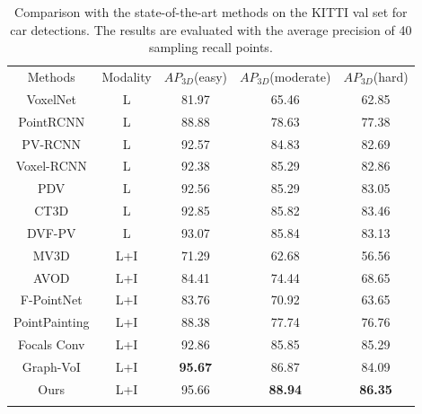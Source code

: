 \begin{sloppypar}
\begin{table}[!t]
\renewcommand{\arraystretch}{1.3}
\setlength\tabcolsep{28pt}%
\caption{Comparison with the state-of-the-art methods on the KITTI val set for car detections. The results are evaluated with the average precision of 40 sampling recall points.}
\label{table1}
\centering
\begin{tabular*}{\linewidth}{ccccc}
\hline\noalign{\smallskip}
Methods & Modality & $AP_{3D}$(easy) & $AP_{3D}$(moderate) & $AP_{3D}$(hard) \\
\noalign{\smallskip}\hline\noalign{\smallskip}
VoxelNet\cite{19} & L & 81.97 & 65.46 & 62.85 \\
PointRCNN\cite{5} & L & 88.88 & 78.63 & 77.38 \\
PV-RCNN\cite{4} & L & 92.57 & 84.83 & 82.69 \\
Voxel-RCNN\cite{21} & L & 92.38  & 85.29 & 82.86 \\
PDV\cite{3} & L & 92.56 & 85.29 & 83.05 \\
CT3D\cite{2} & L & 92.85 & 85.82 & 83.46 \\ 
DVF-PV\cite{32} & L & 93.07 & 85.84 & 83.13 \\
MV3D\cite{12} & L+I & 71.29 & 62.68 & 56.56 \\
AVOD\cite{13} & L+I & 84.41 & 74.44 & 68.65 \\
F-PointNet\cite{10} & L+I & 83.76 & 70.92 & 63.65  \\
PointPainting\cite{11} & L+I & 88.38 & 77.74 & 76.76 \\
Focals Conv\cite{7} & L+I & 92.86 & 85.85 & 85.29 \\
Graph-VoI\cite{31} & L+I & \bf{95.67} & 86.87 & 84.09 \\
Ours &L+I & 95.66 & \bf{88.94} & \bf{86.35}\\
\noalign{\smallskip}\hline
\end{tabular*}
\end{table}


\end{sloppypar}
